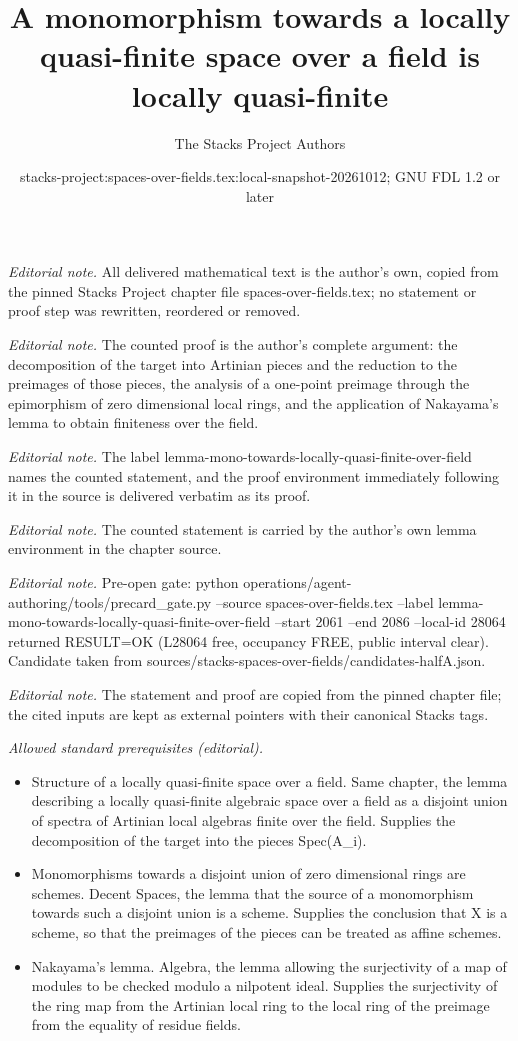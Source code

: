 \documentclass[10pt,a4paper]{amsart}
\title{A monomorphism towards a locally quasi-finite space over a field is locally quasi-finite}
\author{The Stacks Project Authors}
\date{stacks-project:spaces-over-fields.tex:local-snapshot-20261012; GNU FDL 1.2 or later}
\theoremstyle{plain}
\theoremstyle{definition}
\theoremstyle{remark}
\numberwithin{equation}{subsection}
\begin{document}
\maketitle
\noindent\textit{Editorial note.} All delivered mathematical text is the author's own, copied from the pinned Stacks Project chapter file spaces-over-fields.tex; no statement or proof step was rewritten, reordered or removed.\par\medskip
\noindent\textit{Editorial note.} The counted proof is the author's complete argument: the decomposition of the target into Artinian pieces and the reduction to the preimages of those pieces, the analysis of a one-point preimage through the epimorphism of zero dimensional local rings, and the application of Nakayama's lemma to obtain finiteness over the field.\par\medskip
\noindent\textit{Editorial note.} The label lemma-mono-towards-locally-quasi-finite-over-field names the counted statement, and the proof environment immediately following it in the source is delivered verbatim as its proof.\par\medskip
\noindent\textit{Editorial note.} The counted statement is carried by the author's own lemma environment in the chapter source.\par\medskip
\noindent\textit{Editorial note.} Pre-open gate: python operations/agent-authoring/tools/precard\_gate.py --source spaces-over-fields.tex --label lemma-mono-towards-locally-quasi-finite-over-field --start 2061 --end 2086 --local-id 28064 returned RESULT=OK (L28064 free, occupancy FREE, public interval clear). Candidate taken from sources/stacks-spaces-over-fields/candidates-halfA.json.\par\medskip
\noindent\textit{Editorial note.} The statement and proof are copied from the pinned chapter file; the cited inputs are kept as external pointers with their canonical Stacks tags.\par\medskip
\noindent\textit{Allowed standard prerequisites (editorial).}\begin{itemize}
\item Structure of a locally quasi-finite space over a field. Same chapter, the lemma describing a locally quasi-finite algebraic space over a field as a disjoint union of spectra of Artinian local algebras finite over the field. Supplies the decomposition of the target into the pieces Spec(A\_i).
\item Monomorphisms towards a disjoint union of zero dimensional rings are schemes. Decent Spaces, the lemma that the source of a monomorphism towards such a disjoint union is a scheme. Supplies the conclusion that X is a scheme, so that the preimages of the pieces can be treated as affine schemes.
\item Nakayama's lemma. Algebra, the lemma allowing the surjectivity of a map of modules to be checked modulo a nilpotent ideal. Supplies the surjectivity of the ring map from the Artinian local ring to the local ring of the preimage from the equality of residue fields.
\end{itemize}\medskip
\end{document}

